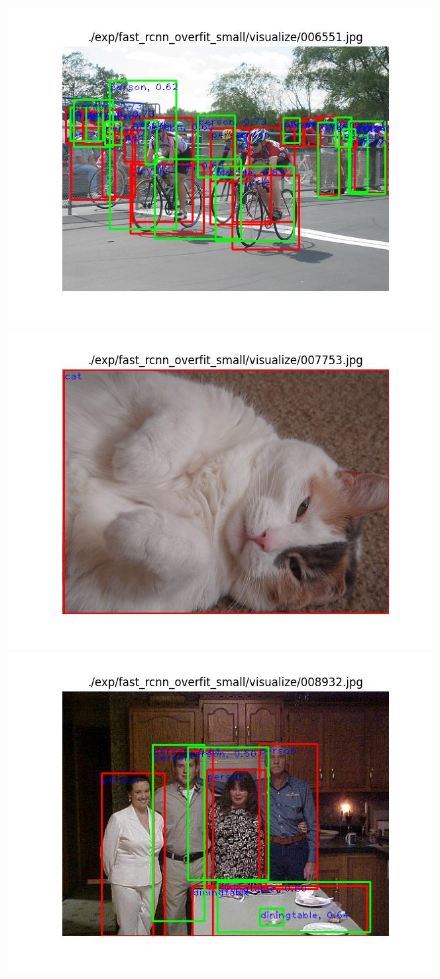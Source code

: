 \documentclass{article}%
\begin{document}
\begin{figure}[H]
    \centering
	\begin{minipage}{0.32\linewidth}
		\centering
		\includegraphics[width=0.9\linewidth]{fast_rcnn_overfit_small/visualize/006551.jpg}
	\end{minipage}
	\begin{minipage}{0.32\linewidth}
		\centering
		\includegraphics[width=0.9\linewidth]{fast_rcnn_overfit_small/visualize/007753.jpg}
	\end{minipage}
    \begin{minipage}{0.32\linewidth}
		\centering
		\includegraphics[width=0.9\linewidth]{fast_rcnn_overfit_small/visualize/008932.jpg}
	\end{minipage}
\end{figure}
\end{document}
